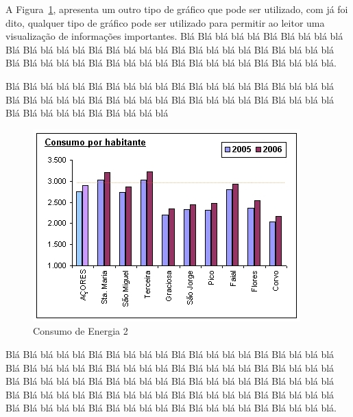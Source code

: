 \documentclass[times, 10pt,twocolumn]{article}
\begin{document}


A Figura~{\ref{fig:figura-003}}, apresenta um outro tipo de gráfico que pode ser utilizado, com já foi dito, qualquer tipo de gráfico pode ser utilizado para permitir ao leitor uma visualização de informações importantes.
Blá Blá blá blá blá Blá Blá blá blá blá Blá Blá blá blá blá Blá Blá blá blá blá Blá Blá blá blá blá Blá Blá blá blá blá Blá Blá blá blá blá Blá Blá blá blá blá Blá Blá blá blá blá Blá Blá blá blá blá.

Blá Blá blá blá blá Blá Blá blá blá blá Blá Blá blá blá blá Blá Blá blá blá blá Blá Blá blá blá blá Blá Blá blá blá blá Blá Blá blá blá blá Blá Blá blá blá blá Blá Blá blá blá blá Blá Blá blá blá blá

\begin{figure}[H]
    \centering
    \includegraphics[width=.5\textwidth]{figuras/consumo-2.jpg}
    \caption{Consumo de Energia 2}
    \label{fig:figura-003}
\end{figure}

Blá Blá blá blá blá Blá Blá blá blá blá Blá Blá blá blá blá Blá Blá blá blá blá Blá Blá blá blá blá Blá Blá blá blá blá Blá Blá blá blá blá Blá Blá blá blá blá Blá Blá blá blá blá Blá Blá blá blá blá
Blá Blá blá blá blá Blá Blá blá blá blá Blá Blá blá blá blá Blá Blá blá blá blá Blá Blá blá blá blá Blá Blá blá blá blá Blá Blá blá blá blá Blá Blá blá blá blá Blá Blá blá blá blá Blá Blá blá blá blá.
\end{document}
